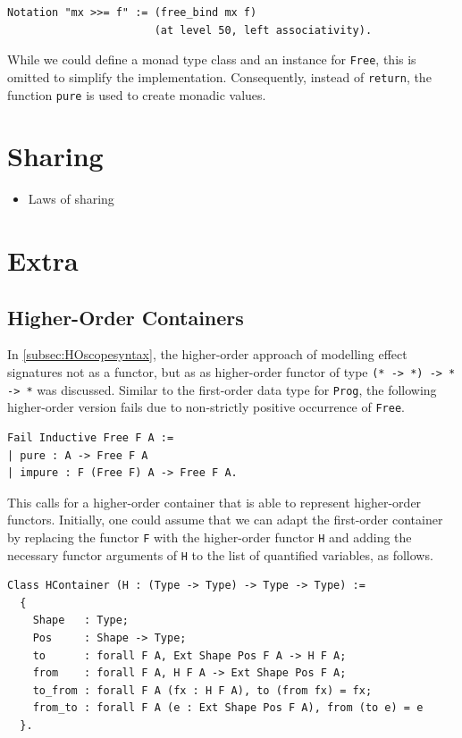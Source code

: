 \documentclass[a4paper, 11pt, fleqn, twoside]{scrreprt}
\newcommand{\hinl}[1]{\texttt{#1}}
\newcommand{\cinl}[1]{\texttt{#1}}
\begin{document}
\begin{verbatim}
Notation "mx >>= f" := (free_bind mx f)
                       (at level 50, left associativity).
\end{verbatim}

While we could define a monad type class and an instance for \cinl{Free}, this is omitted to simplify the implementation.
Consequently, instead of \hinl{return}, the function \cinl{pure} is used to create monadic values.

\section{Sharing}
\label{sec:lawsOfSharing}
\begin{itemize}
\item Laws of sharing
\end{itemize}

\section{Extra}
\subsection{Higher-Order Containers}
In \autoref{subsec:HOscopesyntax}, the higher-order approach of modelling effect signatures not as a functor, but as as higher-order functor of type \hinl{(* -> *) -> * -> *} was discussed.
Similar to the first-order data type for \hinl{Prog}, the following higher-order version fails due to non-strictly positive occurrence of \cinl{Free}.

\begin{verbatim}
Fail Inductive Free F A :=
| pure : A -> Free F A
| impure : F (Free F) A -> Free F A.
\end{verbatim}

This calls for a higher-order container that is able to represent higher-order functors.
Initially, one could assume that we can adapt the first-order container by replacing the functor \cinl{F} with the higher-order functor \cinl{H} and adding the necessary functor arguments of \cinl{H} to the list of quantified variables, as follows.

\begin{verbatim}
Class HContainer (H : (Type -> Type) -> Type -> Type) :=
  {
    Shape   : Type;
    Pos     : Shape -> Type;
    to      : forall F A, Ext Shape Pos F A -> H F A;
    from    : forall F A, H F A -> Ext Shape Pos F A;
    to_from : forall F A (fx : H F A), to (from fx) = fx;
    from_to : forall F A (e : Ext Shape Pos F A), from (to e) = e
  }.
\end{verbatim}
\end{document}
